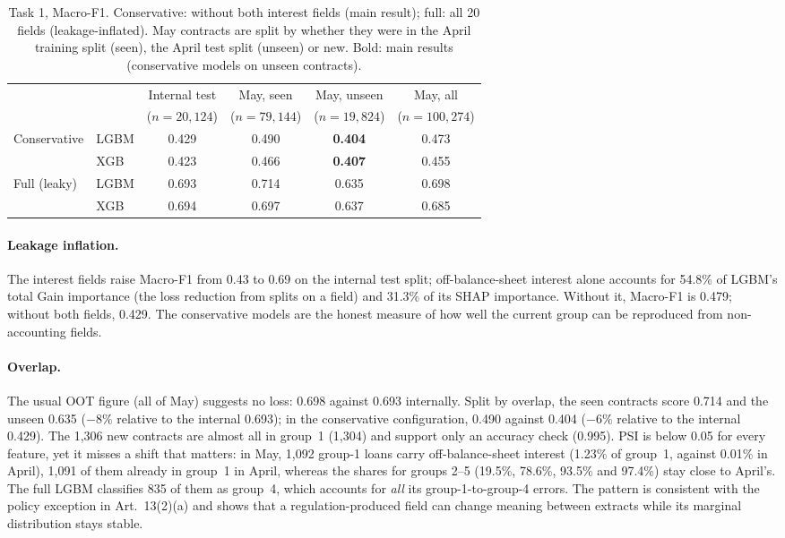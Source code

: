 \documentclass[runningheads]{llncs}
\begin{document}
\begin{table}[t]
\centering
\caption{Task 1, Macro-F1. Conservative: without both interest fields (main result); full: all 20 fields (leakage-inflated). May contracts are split by whether they were in the April training split (seen), the April test split (unseen) or new. Bold: main results (conservative models on unseen contracts).}
\label{tab:task1}
\small
\begin{tabular}{@{}llcccc@{}}
\toprule
& & Internal test & May, seen & May, unseen & May, all\\
& & ($n=20{,}124$) & ($n=79{,}144$) & ($n=19{,}824$) & ($n=100{,}274$)\\
\midrule
Conservative & LGBM & 0.429 & 0.490 & \textbf{0.404} & 0.473\\
 & XGB & 0.423 & 0.466 & \textbf{0.407} & 0.455\\
Full (leaky) & LGBM & 0.693 & 0.714 & 0.635 & 0.698\\
 & XGB & 0.694 & 0.697 & 0.637 & 0.685\\
\bottomrule
\end{tabular}
\end{table}

\paragraph{Leakage inflation.} The interest fields raise Macro-F1 from 0.43 to 0.69 on the internal test split; off-balance-sheet interest alone accounts for 54.8\% of LGBM's total Gain importance (the loss reduction from splits on a field) and 31.3\% of its SHAP importance. Without it, Macro-F1 is 0.479; without both fields, 0.429. The conservative models are the honest measure of how well the current group can be reproduced from non-accounting fields.

\paragraph{Overlap.} The usual OOT figure (all of May) suggests no loss: 0.698 against 0.693 internally. Split by overlap, the seen contracts score 0.714 and the unseen 0.635 ($-8\%$ relative to the internal 0.693); in the conservative configuration, 0.490 against 0.404 ($-6\%$ relative to the internal 0.429). The 1,306 new contracts are almost all in group~1 (1,304) and support only an accuracy check (0.995). PSI is below 0.05 for every feature, yet it misses a shift that matters: in May, 1,092 group-1 loans carry off-balance-sheet interest (1.23\% of group~1, against 0.01\% in April), 1,091 of them already in group~1 in April, whereas the shares for groups 2--5 (19.5\%, 78.6\%, 93.5\% and 97.4\%) stay close to April's. The full LGBM classifies 835 of them as group~4, which accounts for \emph{all} its group-1-to-group-4 errors. The pattern is consistent with the policy exception in Art.~13(2)(a) and shows that a regulation-produced field can change meaning between extracts while its marginal distribution stays stable.
\end{document}
